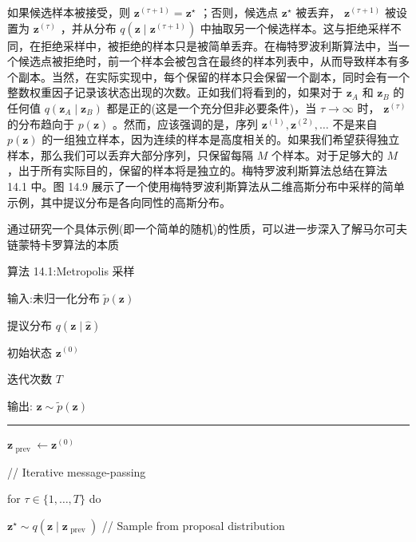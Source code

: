 \documentclass[10pt]{report}
\newcommand{\HRule}{\begin{center}\rule{0.9\linewidth}{0.2mm}\end{center}}
\begin{document}
如果候选样本被接受，则 \({\mathbf{z}}^{\left( \tau  + 1\right) } = {\mathbf{z}}^{ \star  }\) ；否则，候选点 \({\mathbf{z}}^{ \star  }\) 被丢弃， \({\mathbf{z}}^{\left( \tau  + 1\right) }\) 被设置为 \({\mathbf{z}}^{\left( \tau \right) }\) ，并从分布 \(q\left( {\mathbf{z} \mid  {\mathbf{z}}^{\left( \tau  + 1\right) }}\right)\) 中抽取另一个候选样本。这与拒绝采样不同，在拒绝采样中，被拒绝的样本只是被简单丢弃。在梅特罗波利斯算法中，当一个候选点被拒绝时，前一个样本会被包含在最终的样本列表中，从而导致样本有多个副本。当然，在实际实现中，每个保留的样本只会保留一个副本，同时会有一个整数权重因子记录该状态出现的次数。正如我们将看到的，如果对于 \({\mathbf{z}}_{A}\) 和 \({\mathbf{z}}_{B}\) 的任何值 \(q\left( {{\mathbf{z}}_{A} \mid  {\mathbf{z}}_{B}}\right)\) 都是正的(这是一个充分但非必要条件)，当 \(\tau  \rightarrow  \infty\) 时， \({\mathbf{z}}^{\left( \tau \right) }\) 的分布趋向于 \(p\left( \mathbf{z}\right)\) 。然而，应该强调的是，序列 \({\mathbf{z}}^{\left( 1\right) },{\mathbf{z}}^{\left( 2\right) },\ldots\) 不是来自 \(p\left( \mathbf{z}\right)\) 的一组独立样本，因为连续的样本是高度相关的。如果我们希望获得独立样本，那么我们可以丢弃大部分序列，只保留每隔 \(M\) 个样本。对于足够大的 \(M\) ，出于所有实际目的，保留的样本将是独立的。梅特罗波利斯算法总结在算法 14.1 中。图 14.9 展示了一个使用梅特罗波利斯算法从二维高斯分布中采样的简单示例，其中提议分布是各向同性的高斯分布。

通过研究一个具体示例(即一个简单的随机)的性质，可以进一步深入了解马尔可夫链蒙特卡罗算法的本质

算法 14.1:Metropolis 采样

输入:未归一化分布 \(\widetilde{p}\left( \mathbf{z}\right)\)

提议分布 \(q\left( {\mathbf{z} \mid  \widehat{\mathbf{z}}}\right)\)

初始状态 \({\mathbf{z}}^{\left( 0\right) }\)

迭代次数 \(T\)

输出: \(\mathbf{z} \sim  \widetilde{p}\left( \mathbf{z}\right)\)

\HRule

\({\mathbf{z}}_{\text{ prev }} \leftarrow  {\mathbf{z}}^{\left( 0\right) }\)

// Iterative message-passing

for \(\tau  \in  \{ 1,\ldots ,T\}\) do

\hspace*{1em} \({\mathbf{z}}^{ \star  } \sim  q\left( {\mathbf{z} \mid  {\mathbf{z}}_{\text{ prev }}}\right)\) // Sample from proposal distribution
\end{document}
